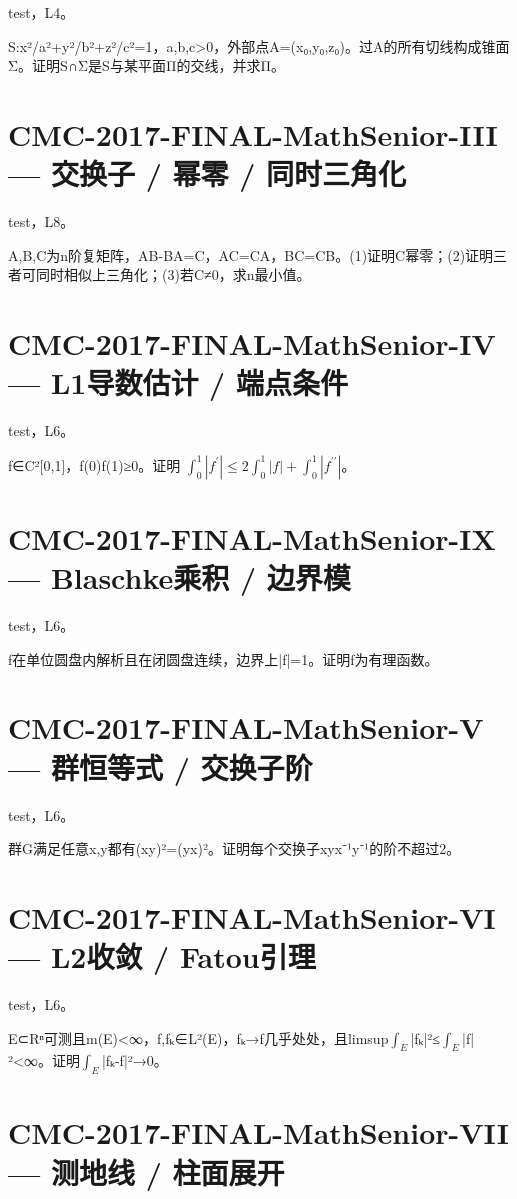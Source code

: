 \documentclass[UTF8]{ctexart}
\begin{document}
test，L4。

S:x²/a²+y²/b²+z²/c²=1，a,b,c>0，外部点A=(x₀,y₀,z₀)。过A的所有切线构成锥面Σ。证明S∩Σ是S与某平面Π的交线，并求Π。

\section*{CMC-2017-FINAL-MathSenior-III — 交换子 / 幂零 / 同时三角化}

test，L8。

A,B,C为n阶复矩阵，AB-BA=C，AC=CA，BC=CB。(1)证明C幂零；(2)证明三者可同时相似上三角化；(3)若C≠0，求n最小值。

\section*{CMC-2017-FINAL-MathSenior-IV — L1导数估计 / 端点条件}

test，L6。

f∈C²[0,1]，f(0)f(1)≥0。证明 $\int_0^1|f^{\prime}|\le2\int_0^1|f|+\int_0^1|f^{\prime\prime}|$。

\section*{CMC-2017-FINAL-MathSenior-IX — Blaschke乘积 / 边界模}

test，L6。

f在单位圆盘内解析且在闭圆盘连续，边界上|f|=1。证明f为有理函数。

\section*{CMC-2017-FINAL-MathSenior-V — 群恒等式 / 交换子阶}

test，L6。

群G满足任意x,y都有(xy)²=(yx)²。证明每个交换子xyx⁻¹y⁻¹的阶不超过2。

\section*{CMC-2017-FINAL-MathSenior-VI — L2收敛 / Fatou引理}

test，L6。

E⊂Rⁿ可测且m(E)<∞，f,fₖ∈L²(E)，fₖ→f几乎处处，且limsup$∫_E$|fₖ|²≤$∫_E$|f|²<∞。证明$∫_E$|fₖ-f|²→0。

\section*{CMC-2017-FINAL-MathSenior-VII — 测地线 / 柱面展开}
\end{document}
